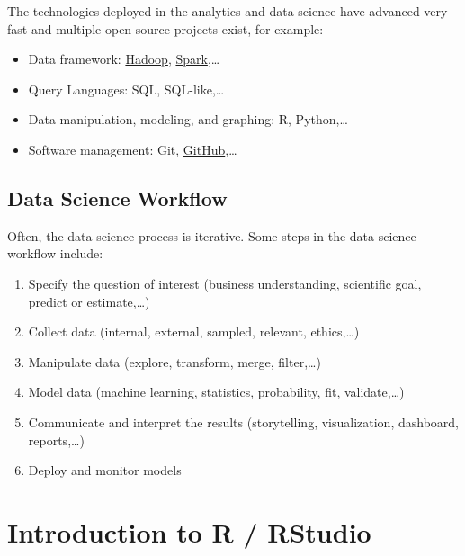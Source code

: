 \documentclass[
  letterpaper,
  DIV=11,
  numbers=noendperiod]{scrreprt}
\providecommand{\tightlist}{%
  \setlength{\itemsep}{0pt}\setlength{\parskip}{0pt}}\usepackage{longtable,booktabs,array}
\begin{document}
The technologies deployed in the analytics and data science have
advanced very fast and multiple open source projects exist, for example:

\begin{itemize}
\tightlist
\item
  Data framework: \href{https://hadoop.apache.org/}{Hadoop},
  \href{https://spark.apache.org/}{Spark},\ldots{}
\item
  Query Languages: SQL, SQL-like,\ldots{}
\item
  Data manipulation, modeling, and graphing: R, Python,\ldots{}
\item
  Software management: Git, \href{https://github.com/}{GitHub},\ldots{}
\end{itemize}

\hypertarget{data-science-workflow}{%
\subsection*{Data Science Workflow}\label{data-science-workflow}}

Often, the data science process is iterative. Some steps in the data
science workflow include:

\begin{enumerate}
\def\labelenumi{\arabic{enumi}.}
\tightlist
\item
  Specify the question of interest (business understanding, scientific
  goal, predict or estimate,\ldots)
\item
  Collect data (internal, external, sampled, relevant, ethics,\ldots)
\item
  Manipulate data (explore, transform, merge, filter,\ldots)
\item
  Model data (machine learning, statistics, probability, fit,
  validate,\ldots)
\item
  Communicate and interpret the results (storytelling, visualization,
  dashboard, reports,\ldots)
\item
  Deploy and monitor models
\end{enumerate}

\hypertarget{introduction-to-r-rstudio}{%
\section*{Introduction to R / RStudio}\label{introduction-to-r-rstudio}}
\end{document}
